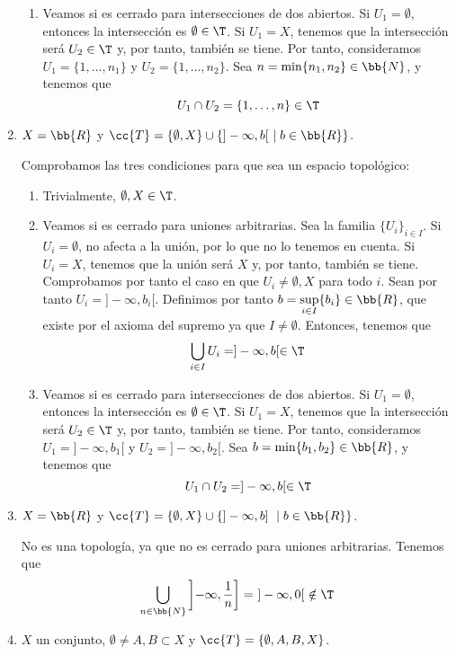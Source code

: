 \begin{ejercicio}
\begin{enumerate}[label=\alph*)]
\begin{enumerate}
            \item Veamos si es cerrado para intersecciones de dos abiertos. Si $U_1=\emptyset$, entonces la intersección es $\emptyset\in \T$. Si $U_1=X$, tenemos que la intersección será $U_2\in \T$ y, por tanto, también se tiene. Por tanto, consideramos $U_1=\{1,\dots,n_1\}$ y $U_2=\{1,\dots, n_2\}$. Sea $n=\min\{n_1, n_2\}\in \bb{N}$, y tenemos que
            $$U_1\cap U_2 = \{1,\dots, n\}\in \T$$
        \end{enumerate}

        \item $X=\bb{R}$ y $\cc{T}=\{\emptyset, X\}\cup \left\{]-\infty, b[~\mid b\in \bb{R}\right\}$.

        Comprobamos las tres condiciones para que sea un espacio topológico:
        \begin{enumerate}
            \item Trivialmente, $\emptyset, X\in \T$.
            \item Veamos si es cerrado para uniones arbitrarias. Sea la familia $\{U_i\}_{i\in I}$. Si $U_i=\emptyset$, no afecta a la unión, por lo que no lo tenemos en cuenta. Si $U_i=X$, tenemos que la unión será $X$ y, por tanto, también se tiene. Comprobamos por tanto el caso en que $U_i\neq \emptyset, X$ para todo $i$. Sean por tanto $U_i=]-\infty, b_i[$. Definimos por tanto $b=\sup\limits_{i\in I}\{b_i\}\in \bb{R}$, que existe por el axioma del supremo ya que $I\neq \emptyset$. Entonces, tenemos que
            $$\bigcup_{i\in I}U_i = ]-\infty,b[\in \T$$

            \item Veamos si es cerrado para intersecciones de dos abiertos. Si $U_1=\emptyset$, entonces la intersección es $\emptyset\in \T$. Si $U_1=X$, tenemos que la intersección será $U_2\in \T$ y, por tanto, también se tiene. Por tanto, consideramos $U_1=]-\infty, b_1[$ y $U_2=]-\infty, b_2[$. Sea $b=\min\{b_1, b_2\}\in \bb{R}$, y tenemos que
            $$U_1\cap U_2 = ]-\infty, b[\in \T$$
        \end{enumerate}

        \item $X=\bb{R}$ y $\cc{T}=\{\emptyset, X\}\cup \left\{]-\infty, b]~\mid  b\in \bb{R}\right\}$.

        No es una topología, ya que no es cerrado para uniones arbitrarias. Tenemos que
        $$\bigcup_{n\in \bb{N}}\left]-\infty, \frac{1}{n}\right]=~]-\infty, 0[~\notin \T$$

        \item $X$ un conjunto, $\emptyset\neq A,B\subset X$ y $\cc{T}=\{\emptyset, A, B, X\}$.


\end{enumerate}
\end{ejercicio}
